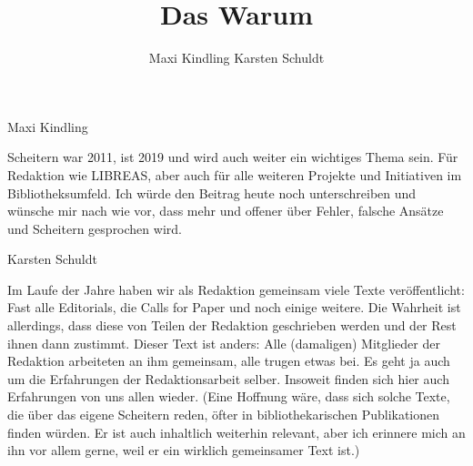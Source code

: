 \documentclass[output=paper]{langsci/langscibook}
\title{Das Warum}
\author{ Maxi Kindling \lastand Karsten Schuldt}
\begin{document}
\maketitle

\noindent Maxi Kindling

\noindent Scheitern war 2011, ist 2019 und wird auch weiter ein wichtiges Thema sein. Für Redaktion wie LIBREAS, aber auch für alle weiteren Projekte und Initiativen im Bibliotheksumfeld. Ich würde den Beitrag heute noch unterschreiben und wünsche mir nach wie vor, dass mehr und offener über Fehler, falsche Ansätze und Scheitern gesprochen wird.
\vspace{\baselineskip}

\noindent Karsten Schuldt

\noindent Im Laufe der Jahre haben wir als Redaktion gemeinsam viele Texte veröffentlicht: Fast alle Editorials, die Calls for Paper und noch einige weitere. Die Wahrheit ist allerdings, dass diese von Teilen der Redaktion geschrieben werden und der Rest ihnen dann zustimmt. Dieser Text ist anders: Alle (damaligen) Mitglieder der Redaktion arbeiteten an ihm gemeinsam, alle trugen etwas bei. Es geht ja auch um die Erfahrungen der Redaktionsarbeit selber. Insoweit finden sich hier auch Erfahrungen von uns allen wieder. (Eine Hoffnung wäre, dass sich solche Texte, die über das eigene Scheitern reden, öfter in bibliothekarischen Publikationen finden würden. Er ist auch inhaltlich weiterhin relevant, aber ich erinnere mich an ihn vor allem gerne, weil er ein wirklich gemeinsamer Text ist.)
\end{document}
